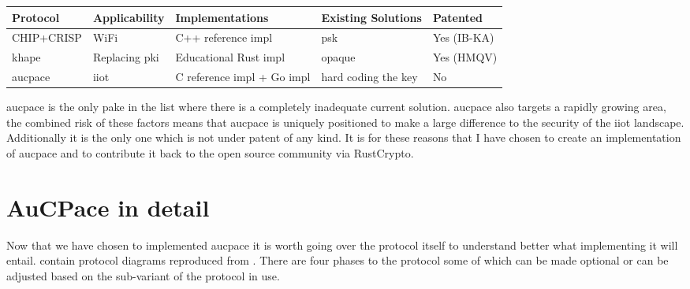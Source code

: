 \begin{center}
  \small
  \begin{tabular}{ llp{2.8cm}ll }
    \toprule
    Protocol & Applicability & Implementations & Existing Solutions & Patented \\
    \midrule
    CHIP+CRISP & WiFi & C++ reference impl & \gls{psk} & Yes (IB-KA)\\
    \gls{khape} & Replacing \gls{pki} & Educational Rust impl & \gls{opaque} & Yes (HMQV)\\
    \gls{aucpace} & \gls{iiot} & C reference impl + Go impl & hard coding the key & No\\
    \bottomrule
  \end{tabular}
\end{center}

\gls{aucpace} is the only \gls{pake} in the list where there is a completely inadequate current solution.
\gls{aucpace} also targets a rapidly growing area, the combined risk of these factors means that \gls{aucpace} is uniquely positioned to make a large difference to the security of the \gls{iiot} landscape.
Additionally it is the only one which is not under patent of any kind.
It is for these reasons that I have chosen to create an implementation of \gls{aucpace} and to contribute it back to the open source community via RustCrypto.

\section{AuCPace in detail}
Now that we have chosen to implemented \gls{aucpace} it is worth going over the protocol itself to understand better what implementing it will entail.
 contain protocol diagrams reproduced from \cite{aucpace}.
There are four phases to the protocol some of which can be made optional or can be adjusted based on the sub-variant of the protocol in use.


